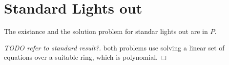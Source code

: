 \section{Standard Lights out}
\begin{theorem}
    The existance and the solution problem for standar lights out are in $P$. 
\end{theorem}

\begin{proof}[TODO refer to standard result?]
    both problems use solving a linear set of equations over a suitable ring, which is polynomial.
\end{proof}